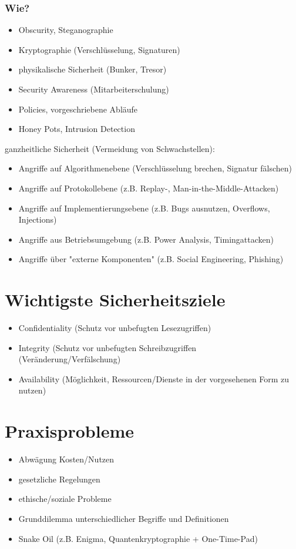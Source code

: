 \documentclass[a4paper,twoside,DIV15,BCOR12mm]{scrbook}
\begin{document}
\subsubsection{Wie?}
	\begin{itemize}
		\item Obscurity, Steganographie
		\item Kryptographie (Verschlüsselung, Signaturen)
		\item physikalische Sicherheit (Bunker, Tresor)
		\item Security Awareness (Mitarbeiterschulung)
		\item Policies, vorgeschriebene Abläufe
		\item Honey Pots, Intrusion Detection
	\end{itemize}
	ganzheitliche Sicherheit (Vermeidung von Schwachstellen):
	\begin{itemize}
		\item Angriffe auf Algorithmenebene (Verschlüsselung brechen, Signatur fälschen)
		\item Angriffe auf Protokollebene (z.B. Replay-, Man-in-the-Middle-Attacken)
		\item Angriffe auf Implementierungsebene (z.B. Bugs ausnutzen, Overflows, Injections)
		\item Angriffe aus Betriebsumgebung (z.B. Power Analysis, Timingattacken)
		\item Angriffe über "externe Komponenten" (z.B. Social Engineering, Phishing)
	\end{itemize}
	
\section{Wichtigste Sicherheitsziele}
	\begin{itemize}
		\item Confidentiality (Schutz vor unbefugten Lesezugriffen)
		\item Integrity (Schutz vor unbefugten Schreibzugriffen (Veränderung/Verfälschung)
		\item Availability (Möglichkeit, Ressourcen/Dienste in der vorgesehenen Form zu nutzen)
	\end{itemize}
	
\section{Praxisprobleme}
	\begin{itemize}
		\item Abwägung Kosten/Nutzen
		\item gesetzliche Regelungen
		\item ethische/soziale Probleme
		\item Grunddilemma unterschiedlicher Begriffe und Definitionen
		\item Snake Oil (z.B. Enigma, Quantenkryptographie + One-Time-Pad)
	\end{itemize}
	
\end{document}
